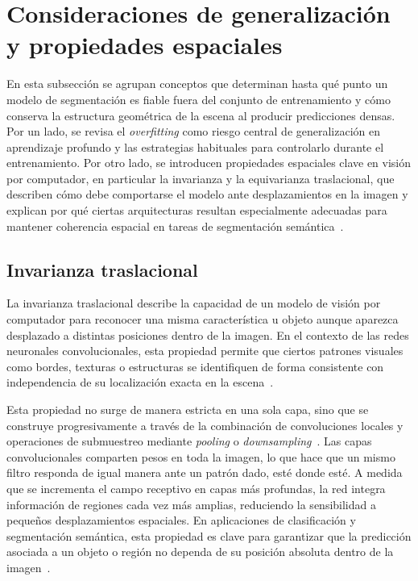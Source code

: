 \section{Consideraciones de generalización y propiedades espaciales}
En esta subsección se agrupan conceptos que determinan hasta qué punto un modelo de segmentación es fiable fuera del conjunto de entrenamiento y cómo conserva la estructura geométrica de la escena al producir predicciones densas. Por un lado, se revisa el \textit{overfitting} como riesgo central de generalización en aprendizaje profundo y las estrategias habituales para controlarlo durante el entrenamiento. Por otro lado, se introducen propiedades espaciales clave en visión por computador, en particular la invarianza y la equivarianza traslacional, que describen cómo debe comportarse el modelo ante desplazamientos en la imagen y explican por qué ciertas arquitecturas resultan especialmente adecuadas para mantener coherencia espacial en tareas de segmentación semántica~\cite{Goodfellow-et-al-2016, dumoulin2018guide, khan2022transformersvision}.

\subsection{Invarianza traslacional}
La invarianza traslacional describe la capacidad de un modelo de visión por computador para reconocer una misma característica u objeto aunque aparezca desplazado a distintas posiciones dentro de la imagen. En el contexto de las redes neuronales convolucionales, esta propiedad permite que ciertos patrones visuales como bordes, texturas o estructuras se identifiquen de forma consistente con independencia de su localización exacta en la escena~\cite{ji2022automation}.

Esta propiedad no surge de manera estricta en una sola capa, sino que se construye progresivamente a través de la combinación de convoluciones locales y operaciones de submuestreo mediante \textit{pooling} o \textit{downsampling}~\cite{dumoulin2018guide}. Las capas convolucionales comparten pesos en toda la imagen, lo que hace que un mismo filtro responda de igual manera ante un patrón dado, esté donde esté. A medida que se incrementa el campo receptivo en capas más profundas, la red integra información de regiones cada vez más amplias, reduciendo la sensibilidad a pequeños desplazamientos espaciales. En aplicaciones de clasificación y segmentación semántica, esta propiedad es clave para garantizar que la predicción asociada a un objeto o región no dependa de su posición absoluta dentro de la imagen~\cite{badrinarayanan2016segnet}.

